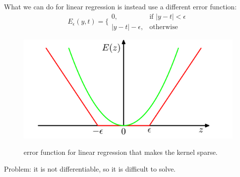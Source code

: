 What we can do for linear regression is instead use a different error function:
\begin{equation}
    E_{\epsilon}(y, t) = \{\begin{array}{lr}
        0, & \text{if } |y - t| < \epsilon\\
        |y - t| - \epsilon, & \text{otherwise}
        \end{array}
\end{equation}

\begin{figure}[H]
    \centering
    \includegraphics[width=15cm]{images/Kernel Methods/ksvm.png}
    \label{fig:ksvm}
    \caption{error function for linear regression that makes the kernel sparse.}
\end{figure}

Problem: it is not differentiable, so it is difficult to solve.


